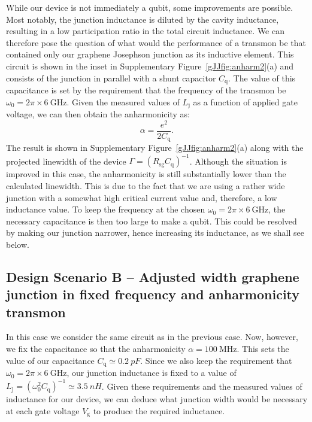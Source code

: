 While our device is not immediately a qubit, some improvements are possible.
Most notably, the junction inductance is diluted by the cavity inductance, resulting in a low participation ratio in the total circuit inductance.
We can therefore pose the question of what would the performance of a transmon be that contained only our graphene Josephson junction as its inductive element.
This circuit is shown in the inset in Supplementary Figure~\ref{gJJfig:anharm2}(a) and consists of the junction in parallel with a shunt capacitor $C_\text{q}$.
The value of this capacitance is set by the requirement that the frequency of the transmon be $\omega_0 = 2\pi\times\SI{6}{\giga\hertz}$.
Given the measured values of $L_\text{j}$ as a function of applied gate voltage, we can then obtain the anharmonicity as:
\begin{equation}
\alpha = \frac{e^2}{2C_\text{q}}.
\end{equation}
The result is shown in Supplementary Figure~\ref{gJJfig:anharm2}(a) along with the projected linewidth of the device $\Gamma = (R_\text{sg}C_\text{q})^{-1}$.
Although the situation is improved in this case, the anharmonicity is still substantially lower than the calculated linewidth.
This is due to the fact that we are using a rather wide junction with a somewhat high critical current value and, therefore, a low inductance value.
To keep the frequency at the chosen $\omega_0 = 2\pi\times\SI{6}{\giga\hertz}$, the necessary capacitance is then too large to make a qubit.
This could be resolved by making our junction narrower, hence increasing its inductance, as we shall see below.



\subsection{Design Scenario B -- Adjusted width graphene junction in fixed frequency and anharmonicity transmon}\label{sec:scenB}

In this case we consider the same circuit as in the previous case.
Now, however, we fix the capacitance so that the anharmonicity $\alpha = \SI{100}{\mega\hertz}$.
This sets the value of our capacitance $C_\text{q}\simeq\SI{0.2}{pF}$.
Since we also keep the requirement that $\omega_0 = 2\pi\times\SI{6}{\giga\hertz}$, our junction inductance is fixed to a value of $L_\text{j} = (\omega_0^2C_\text{q})^{-1} \simeq \SI{3.5}{nH}$.  
Given these requirements and the measured values of inductance for our device, we can deduce what junction width would be necessary at each gate voltage $V_\text{g}$ to produce the required inductance.

